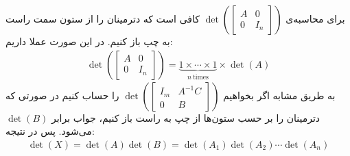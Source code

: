 برای محاسبه‌ی
$\det(\begin{bmatrix} A & 0 \\ 0 & I_n\end{bmatrix})$
کافی است که دترمینان را از ستون سمت راست به چپ باز کنیم. در این صورت عملا داریم:
\begin{gather*}
    \det(\begin{bmatrix} A & 0 \\ 0 & I_n\end{bmatrix}) = \underbrace{1 \times \cdots \times 1}_{n ~ \text{times}} \times \det(A)
\end{gather*}
به طریق مشابه اگر بخواهیم
$\det(\begin{bmatrix} I_m & A^{-1}C \\ 0 & B\end{bmatrix})$
را حساب کنیم در صورتی که دترمینان را بر حسب ستون‌ها از چپ به راست باز کنیم، جواب برابر
$\det(B)$
می‌شود. پس در نتیجه:
\begin{gather*}
    \det(X) = \det(A)\det(B) = \det(A_1) \det(A_2) \cdots \det(A_n)
\end{gather*}